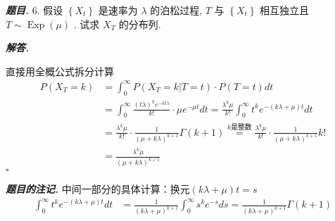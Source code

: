 \documentclass[10pt, a4paper, oneside]{ctexart}
\newenvironment{problem}{\begin{framed}\par\noindent\textbf{\textit{题目. }}}{\end{framed}\par}
\newenvironment{solution}{%
  \par\noindent\textbf{\textit{解答. }}\ignorespaces
}{%
  \hfill\ensuremath{\square}\par %
}
\newenvironment{note}{\par\noindent\textbf{\textit{题目的注记. }}\ignorespaces}{\par}
\begin{document}
\begin{problem}
    6. 假设 \( \left\{  {X}_{t}\right\}   \) 是速率为 \( \lambda  \) 的泊松过程, \( T \) 与 \( \left\{  {X}_{t}\right\}   \) 相互独立且 \( T \sim  \operatorname{Exp}\left( \mu \right)  \) . 试求 \( {X}_{T} \) 的分布列.
\end{problem}
\begin{solution}
    直接用全概公式拆分计算
    \begin{align*}
        P(X_T=k)&=\int_0^{\infty} P(X_T=k|T=t)\cdot P(T=t)dt\\
        &=\int_0^{\infty} \frac{(t\lambda)^ke^{-kt\lambda}}{k!}\cdot \mu e^{-\mu t}dt=\frac{\lambda^k \mu}{k!}\int_0^{\infty} t^ke^{-(k\lambda+\mu)t}dt\\
        &=\frac{\lambda^k \mu}{k!}\cdot \frac{1}{(\mu+k\lambda)^{k+1}}\Gamma(k+1)\overset{k\text{是整数}}{=}\frac{\lambda^k \mu}{k!}\cdot \frac{1}{(\mu+k\lambda)^{k+1}}k!\\
        &=\frac{\lambda^k \mu}{(\mu+k\lambda)^{k+1}}
    \end{align*}
\end{solution}
\begin{note}
    中间一部分的具体计算：换元$(k\lambda+\mu)t=s$
    \begin{align*}
        \int_0^{\infty} t^ke^{-(k\lambda+\mu)t}dt&=\frac{1}{(k\lambda+\mu)^{k+1}}\int_0^{\infty} s^k e^{-s}ds=\frac{1}{(k\lambda+\mu)^{k+1}}\Gamma(k+1)
    \end{align*}
\end{note}
\end{document}
